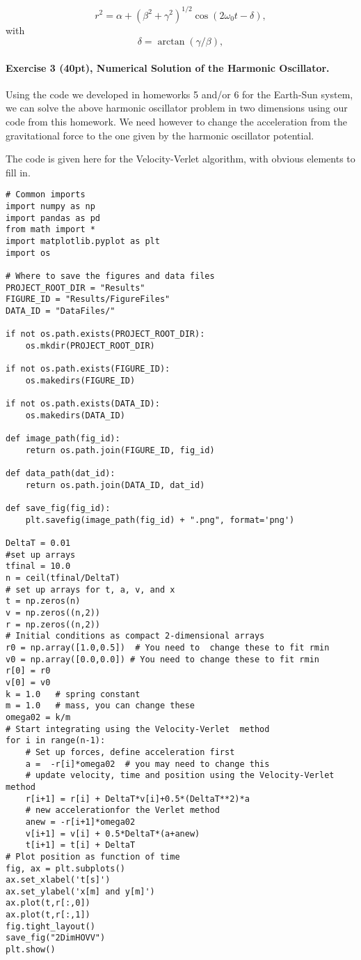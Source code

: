 \documentclass[%
oneside,                 %
final,                   %
10pt]{article}
\begin{document}
\noindent
\[
r^2=\alpha+(\beta^2+\gamma^2)^{1/2}\cos(2\omega_0 t-\delta),
\]
with
\[
\delta=\arctan(\gamma/\beta),
\]


\paragraph{Exercise 3 (40pt), Numerical Solution of the Harmonic Oscillator.}
Using the code we developed in homeworks 5 and/or 6 for the Earth-Sun system, we can solve the above harmonic oscillator problem in two dimensions using our code from this homework. We need however to change the acceleration from the gravitational force to the one given by the harmonic oscillator potential.

The code is given here for the Velocity-Verlet algorithm, with obvious elements to fill in. 
\begin{verbatim}
# Common imports
import numpy as np
import pandas as pd
from math import *
import matplotlib.pyplot as plt
import os

# Where to save the figures and data files
PROJECT_ROOT_DIR = "Results"
FIGURE_ID = "Results/FigureFiles"
DATA_ID = "DataFiles/"

if not os.path.exists(PROJECT_ROOT_DIR):
    os.mkdir(PROJECT_ROOT_DIR)

if not os.path.exists(FIGURE_ID):
    os.makedirs(FIGURE_ID)

if not os.path.exists(DATA_ID):
    os.makedirs(DATA_ID)

def image_path(fig_id):
    return os.path.join(FIGURE_ID, fig_id)

def data_path(dat_id):
    return os.path.join(DATA_ID, dat_id)

def save_fig(fig_id):
    plt.savefig(image_path(fig_id) + ".png", format='png')

DeltaT = 0.01
#set up arrays 
tfinal = 10.0
n = ceil(tfinal/DeltaT)
# set up arrays for t, a, v, and x
t = np.zeros(n)
v = np.zeros((n,2))
r = np.zeros((n,2))
# Initial conditions as compact 2-dimensional arrays
r0 = np.array([1.0,0.5])  # You need to  change these to fit rmin
v0 = np.array([0.0,0.0]) # You need to change these to fit rmin
r[0] = r0
v[0] = v0
k = 1.0   # spring constant
m = 1.0   # mass, you can change these
omega02 = k/m
# Start integrating using the Velocity-Verlet  method
for i in range(n-1):
    # Set up forces, define acceleration first
    a =  -r[i]*omega02  # you may need to change this
    # update velocity, time and position using the Velocity-Verlet method
    r[i+1] = r[i] + DeltaT*v[i]+0.5*(DeltaT**2)*a
    # new accelerationfor the Verlet method
    anew = -r[i+1]*omega02  
    v[i+1] = v[i] + 0.5*DeltaT*(a+anew)
    t[i+1] = t[i] + DeltaT
# Plot position as function of time    
fig, ax = plt.subplots()
ax.set_xlabel('t[s]')
ax.set_ylabel('x[m] and y[m]')
ax.plot(t,r[:,0])
ax.plot(t,r[:,1])
fig.tight_layout()
save_fig("2DimHOVV")
plt.show()

\end{verbatim}
\end{document}
